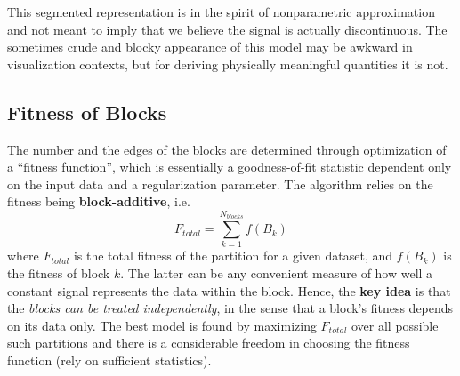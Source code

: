 \documentclass[prb,twocolumn]{revtex4-1}
\begin{document}
This segmented representation is in the spirit of nonparametric approximation and not meant to imply that we believe the signal is actually discontinuous.
The sometimes crude and blocky appearance of this model may be awkward in visualization contexts, but for deriving physically meaningful quantities it is not.

\subsection{Fitness of Blocks}

The number  and the edges of the blocks are determined through optimization of a “fitness function”, which is essentially a goodness-of-fit statistic dependent only on the input data and a regularization parameter.
The algorithm relies on the fitness being \textbf{block-additive}, i.e.
\begin{equation}
    F_{total} = \sum_{k=1}^{N_{blocks}} f(B_k)
\end{equation}
where $F_{total}$ is the total fitness of the partition for a given dataset, and $f(B_k)$ is the fitness of block $k$. The latter can be any convenient measure of how well a constant signal represents the data within the block.
Hence, the \textbf{key idea} is that the \textit{blocks can be treated independently}, in the sense that a block’s fitness depends on its data only.
The best model is found by maximizing $F_{total}$ over all possible such partitions and there is a considerable freedom in choosing the fitness function (rely on sufficient statistics). 
\end{document}
